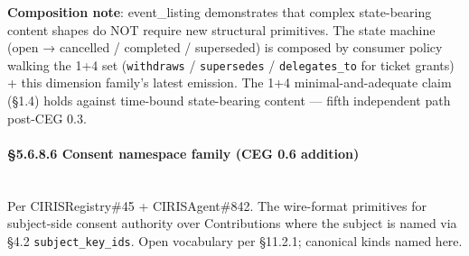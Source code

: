\documentclass[10pt]{article}
\begin{document}
\textbf{Composition note}: event\_listing demonstrates that complex state-bearing content shapes do NOT require new structural primitives. The state machine (open → cancelled / completed / superseded) is composed by consumer policy walking the 1+4 set (\texttt{withdraws} / \texttt{supersedes} / \texttt{delegates\_to} for ticket grants) + this dimension family's latest emission. The 1+4 minimal-and-adequate claim (§1.4) holds against time-bound state-bearing content — fifth independent path post-CEG 0.3.


\paragraph{§5.6.8.6 Consent namespace family (CEG 0.6 addition)}\mbox{}\\


Per CIRISRegistry\#45 + CIRISAgent\#842. The wire-format primitives for subject-side consent authority over Contributions where the subject is named via §4.2 \texttt{subject\_key\_ids}. Open vocabulary per §11.2.1; canonical kinds named here.
\end{document}
